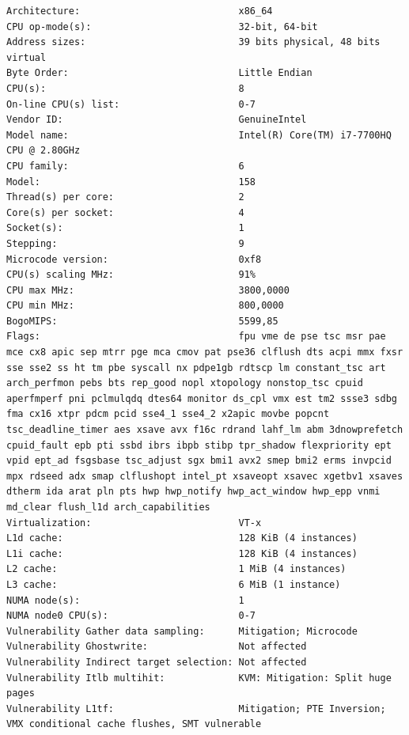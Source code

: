 \begin{lstlisting}[caption={Ausagbe von lscpu und lscpu --caches des
Intel\textregistered\space Core\texttrademark\space i7-7700HQ}]
Architecture:                            x86_64
CPU op-mode(s):                          32-bit, 64-bit
Address sizes:                           39 bits physical, 48 bits virtual
Byte Order:                              Little Endian
CPU(s):                                  8
On-line CPU(s) list:                     0-7
Vendor ID:                               GenuineIntel
Model name:                              Intel(R) Core(TM) i7-7700HQ CPU @ 2.80GHz
CPU family:                              6
Model:                                   158
Thread(s) per core:                      2
Core(s) per socket:                      4
Socket(s):                               1
Stepping:                                9
Microcode version:                       0xf8
CPU(s) scaling MHz:                      91%
CPU max MHz:                             3800,0000
CPU min MHz:                             800,0000
BogoMIPS:                                5599,85
Flags:                                   fpu vme de pse tsc msr pae mce cx8 apic sep mtrr pge mca cmov pat pse36 clflush dts acpi mmx fxsr sse sse2 ss ht tm pbe syscall nx pdpe1gb rdtscp lm constant_tsc art arch_perfmon pebs bts rep_good nopl xtopology nonstop_tsc cpuid aperfmperf pni pclmulqdq dtes64 monitor ds_cpl vmx est tm2 ssse3 sdbg fma cx16 xtpr pdcm pcid sse4_1 sse4_2 x2apic movbe popcnt tsc_deadline_timer aes xsave avx f16c rdrand lahf_lm abm 3dnowprefetch cpuid_fault epb pti ssbd ibrs ibpb stibp tpr_shadow flexpriority ept vpid ept_ad fsgsbase tsc_adjust sgx bmi1 avx2 smep bmi2 erms invpcid mpx rdseed adx smap clflushopt intel_pt xsaveopt xsavec xgetbv1 xsaves dtherm ida arat pln pts hwp hwp_notify hwp_act_window hwp_epp vnmi md_clear flush_l1d arch_capabilities
Virtualization:                          VT-x
L1d cache:                               128 KiB (4 instances)
L1i cache:                               128 KiB (4 instances)
L2 cache:                                1 MiB (4 instances)
L3 cache:                                6 MiB (1 instance)
NUMA node(s):                            1
NUMA node0 CPU(s):                       0-7
Vulnerability Gather data sampling:      Mitigation; Microcode
Vulnerability Ghostwrite:                Not affected
Vulnerability Indirect target selection: Not affected
Vulnerability Itlb multihit:             KVM: Mitigation: Split huge pages
Vulnerability L1tf:                      Mitigation; PTE Inversion; VMX conditional cache flushes, SMT vulnerable

\end{lstlisting}
